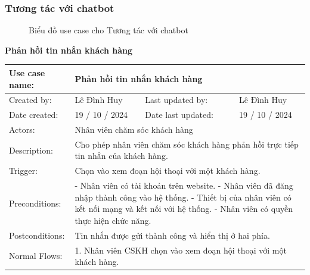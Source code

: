 \subsubsection{Tương tác với chatbot}
\begin{figure}[H]
    \centering
    
    \vspace{0.5cm}
    \caption{Biểu đồ use case cho Tương tác với chatbot}
    \label{fig:enter-label}
\end{figure}
\textbf{Phản hồi tin nhắn khách hàng}
\begin{table}[H]
    \centering
    \begin{tabular}{|l|l|l|l|} 
        \hline
        Use case name: & \multicolumn{3}{|l|}{Phản hồi tin nhắn khách hàng} \\
        \hline
        Created by: & Lê Đình Huy & Last updated by: & Lê Đình Huy \\
        \hline
        Date created: & 19 / 10 / 2024 & Date last updated: & 19 / 10 / 2024 \\
        \hline
        Actors: & \multicolumn{3}{|l|}{Nhân viên chăm sóc khách hàng} \\
        \hline
        Description: & \multicolumn{3}{|p{12cm}|}{Cho phép nhân viên chăm sóc khách hàng phản hồi trực tiếp tin nhắn của khách hàng.} \\ 
        \hline
        Trigger: & \multicolumn{3}{|p{12cm}|}{Chọn vào xem đoạn hội thoại với một khách hàng.} \\
        \hline
        Preconditions: & \multicolumn{3}{|p{12cm}|}{- Nhân viên có tài khoản trên website. \newline
        - Nhân viên đã đăng nhập thành công vào hệ thống. \newline
        - Thiết bị của nhân viên có kết nối mạng và kết nối với hệ thống. \newline
        - Nhân viên có quyền thực hiện chức năng.} \\
        \hline
        Postconditions: & \multicolumn{3}{|p{12cm}|}{Tin nhắn được gửi thành công và hiển thị ở hai phía.} \\
        \hline
        Normal Flows: & \multicolumn{3}{|p{12cm}|}{1. Nhân viên CSKH chọn vào xem đoạn hội thoại với một khách hàng. \newline
}
\end{tabular}
\end{table}
